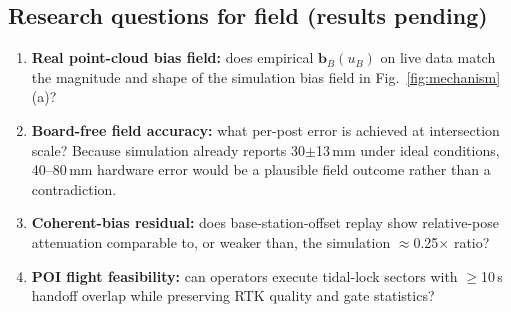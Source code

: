 \begin{table}[!t]
  \centering
  \caption{Campaign D: field replay test of coherent-bias attenuation in relative
  extrinsics (placeholder; simulation reference is mean$\pm$std over seeds).}
  \label{tab:field_relext}
  \footnotesize
\end{table}

\subsection{Research questions for field (results pending)}
\begin{enumerate}
  \item \textbf{Real point-cloud bias field:} does empirical $\mathbf{b}_B(u_B)$ on
    live data match the magnitude and shape of the simulation bias field in
    Fig.~\ref{fig:mechanism}(a)?
  \item \textbf{Board-free field accuracy:} what per-post error is achieved at
    intersection scale? Because simulation already reports 30$\pm$13\,mm under ideal
    conditions, 40--80\,mm hardware error would be a plausible field outcome rather
    than a contradiction.
  \item \textbf{Coherent-bias residual:} does base-station-offset replay show
    relative-pose attenuation comparable to, or weaker than, the simulation
    $\approx$0.25$\times$ ratio?
  \item \textbf{POI flight feasibility:} can operators execute tidal-lock sectors
    with $\geq$10\,s handoff overlap while preserving RTK quality and gate statistics?
\end{enumerate}

